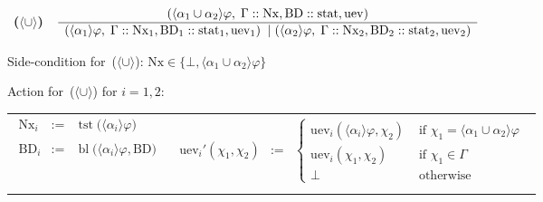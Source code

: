 \documentclass{entcs}
\newcommand{\pea}[2]{\langle#1\rangle #2}
\newcommand{\pup}[2]{#1\cup#2}
\newcommand{\tnode}[3]{(#1 :: #2 :: #3)}
\newcommand{\tnext}{\mathrm{Nx}}
\newcommand{\tbdia}{\mathrm{BD}}
\newcommand{\tmrk}{\mathrm{stat}}
\newcommand{\tuev}{\mathrm{uev}}
\newcommand{\treu}{$\pea{\pup{}{}}{}$}
\newcommand{\tfean}{\mathop{\mathrm{tst}}}
\newcommand{\tbl}{\mathop{\mathrm{bl}}}
\newcommand{\ds}{\displaystyle\strut}
\newcommand{\ruleone}[3]{
\mbox{ {\bf #1} \ $\frac{\ds \mbox{$#2$}}{\ds \mbox{$#3$}}$}}
\begin{document}
\begin{center}
  \ruleone{(\treu{})}
  {\tnode{\pea{\pup{\alpha_1}{\alpha_2}}{\varphi} , \; \Gamma}{\tnext, \tbdia}{\tmrk, \tuev}}
  {\begin{array}{l}
      \tnode{\pea{\alpha_1}{\varphi} , \; \Gamma}{\tnext_1, \tbdia_1}{\tmrk_1, \tuev_1} \; \mid 
      \tnode{\pea{\alpha_2}{\varphi} , \; \Gamma}{\tnext_2, \tbdia_2}{\tmrk_2, \tuev_2}
    \end{array}}
\end{center}
Side-condition for~(\treu{}): $\tnext \in \{ \bot, \pea{\pup{\alpha_1}{\alpha_2}}{\varphi} \}$
\begin{flushleft}
  Action for~(\treu{}) for $i = 1,2$:
  \begin{tabular}[c]{lr}
    \begin{minipage}[c]{0.26\linewidth}
      \begin{eqnarray*}
        \tnext_i & := & \tfean\big( \pea{\alpha_i}{\varphi} \big)
        \\ \\
        \tbdia_i & := & \tbl\big( \pea{\alpha_i}{\varphi}, \tbdia \big)
      \end{eqnarray*}
    \end{minipage}
    &
    \begin{minipage}[c]{0.74\linewidth}
      \begin{eqnarray*}
        \tuev_i'(\chi_1, \chi_2) & := &
        \left\{
          \begin{array}{ll}
            \tuev_i(\pea{\alpha_i}{\varphi}, \chi_2) & \text{ if } \chi_1 = \pea{\pup{\alpha_1}{\alpha_2}}{\varphi}\\
            \tuev_i(\chi_1, \chi_2) & \text{ if } \chi_1 \in \Gamma\\
            \bot & \text{ otherwise}
          \end{array}
        \right . \\
      \end{eqnarray*}
    \end{minipage}
  \end{tabular}
\end{flushleft}
\end{document}
